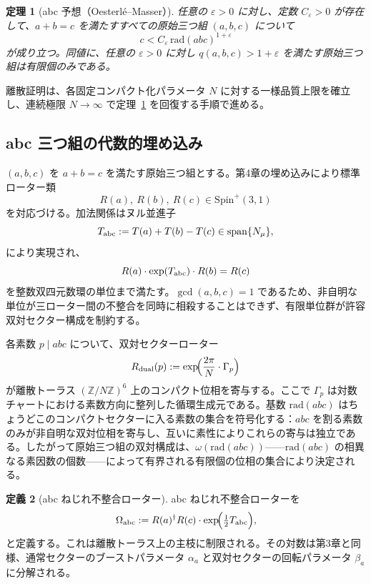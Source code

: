 \documentclass[dvipdfmx,a4paper]{article}
\newtheorem{theorem}{定理}[section]
\theoremstyle{definition}
\newtheorem{definition}[theorem]{定義}
\theoremstyle{remark}
\begin{document}
\begin{theorem}[abc 予想（Oesterlé--Masser）]
\label{thm:abc-classical-ja}
任意の $\varepsilon > 0$ に対し、定数 $C_\varepsilon > 0$ が存在して、$a + b = c$ を満たすすべての原始三つ組 $(a,b,c)$ について
\[
c < C_\varepsilon \, \mathrm{rad}(abc)^{1+\varepsilon}
\]
が成り立つ。同値に、任意の $\varepsilon > 0$ に対し $q(a,b,c) > 1 + \varepsilon$ を満たす原始三つ組は有限個のみである。
\end{theorem}

離散証明は、各固定コンパクト化パラメータ $N$ に対する一様品質上限を確立し、連続極限 $N \to \infty$ で定理~\ref{thm:abc-classical-ja} を回復する手順で進める。

\subsection{abc 三つ組の代数的埋め込み}

$(a,b,c)$ を $a + b = c$ を満たす原始三つ組とする。第4章の埋め込みにより標準ローター類
\[
R(a),\ R(b),\ R(c) \in \mathrm{Spin}^+(3,1)
\]
を対応づける。加法関係はヌル並進子
\[
T_{\rm abc} := T(a) + T(b) - T(c) \in \operatorname{span}\{N_\mu\},
\]
により実現され、
\[
R(a) \cdot \exp(T_{\rm abc}) \cdot R(b) = R(c)
\]
を整数双四元数環の単位まで満たす。$\gcd(a,b,c) = 1$ であるため、非自明な単位が三ローター間の不整合を同時に相殺することはできず、有限単位群が許容双対セクター構成を制約する。

各素数 $p \mid abc$ について、双対セクターローター
\[
R_{\rm dual}(p) := \exp\!\Bigl( \frac{2\pi}{N} \cdot \Gamma_p \Bigr)
\]
が離散トーラス $(\mathbb{Z}/N\mathbb{Z})^6$ 上のコンパクト位相を寄与する。ここで $\Gamma_p$ は対数チャートにおける素数方向に整列した循環生成元である。基数 $\mathrm{rad}(abc)$ はちょうどこのコンパクトセクターに入る素数の集合を符号化する：$abc$ を割る素数のみが非自明な双対位相を寄与し、互いに素性によりこれらの寄与は独立である。したがって原始三つ組の双対構成は、$\omega(\mathrm{rad}(abc))$——$\mathrm{rad}(abc)$ の相異なる素因数の個数——によって有界される有限個の位相の集合により決定される。

\begin{definition}[abc ねじれ不整合ローター]
abc ねじれ不整合ローターを
\[
\Omega_{\rm abc} := R(a)^\dagger R(c) \cdot \exp\!\Bigl( \tfrac12 T_{\rm abc} \Bigr),
\]
と定義する。これは離散トーラス上の主枝に制限される。その対数は第3章と同様、通常セクターのブーストパラメータ $\alpha_a$ と双対セクターの回転パラメータ $\beta_a$ に分解される。
\end{definition}
\end{document}
